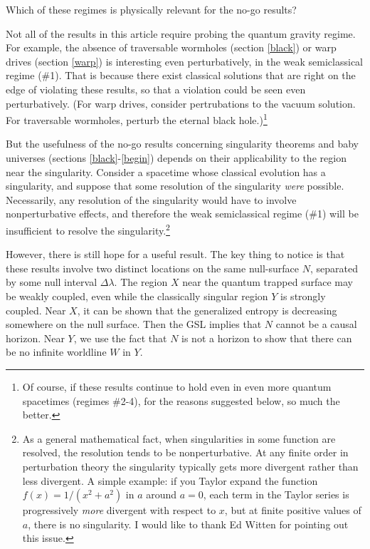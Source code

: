 \documentclass[12pt]{article}
\begin{document}
\noindent Which of these regimes is physically relevant for the no-go results?

Not all of the results in this article require probing the quantum gravity regime.  For example, the absence of traversable wormholes (section \ref{black}) or warp drives (section \ref{warp}) is interesting even perturbatively, in the weak semiclassical regime (\#1).  That is because there exist classical solutions that are right on the edge of violating these results, so that a violation could be seen even perturbatively.  (For warp drives, consider pertrubations to the vacuum solution.  For traversable wormholes, perturb the eternal black hole.)\footnote{Of course, if these results continue to hold even in even more quantum spacetimes (regimes \#2-4), for the reasons suggested below, so much the better.}

But the usefulness of the no-go results concerning singularity theorems and baby universes (sections \ref{black}-\ref{begin}) depends on their applicability to the region near the singularity.  Consider a spacetime whose classical evolution has a singularity, and suppose that some resolution of the singularity \emph{were} possible.  Necessarily, any resolution of the singularity would have to involve nonperturbative effects, and therefore the weak semiclassical regime (\#1) will be insufficient to resolve the singularity.\footnote{As a general mathematical fact, when singularities in some function are resolved, the resolution tends to be nonperturbative.  At any finite order in perturbation theory the singularity typically gets more divergent rather than less divergent.  A simple example: if you Taylor expand the function $f(x) = 1/(x^2 + a^2)$ in $a$ around $a = 0$, each term in the Taylor series is progressively \emph{more} divergent with respect to $x$, but at finite positive values of $a$, there is no singularity.  I would like to thank Ed Witten for pointing out this issue.}

However, there is still hope for a useful result. The key thing to notice is that these results involve two distinct locations on the same null-surface $N$, separated by some null interval $\Delta \lambda$.  The region $X$ near the quantum trapped surface may be weakly coupled, even while the classically singular region $Y$  is strongly coupled.  Near $X$, it can be shown that the generalized entropy is decreasing somewhere on the null surface.  Then the GSL implies that $N$ cannot be a causal horizon.  Near $Y$, we use the fact that $N$ is not a horizon to show that there can be no infinite worldline $W$ in $Y$.
\end{document}
